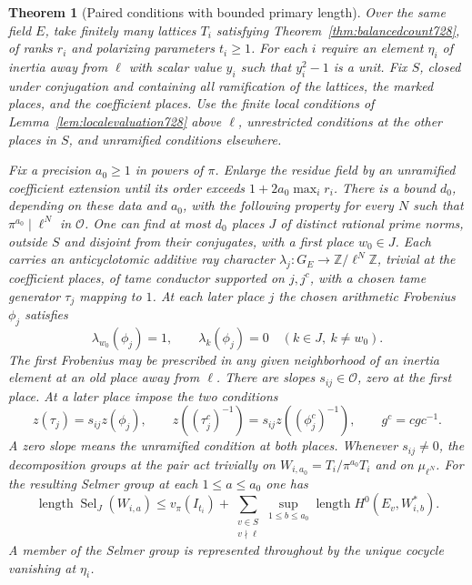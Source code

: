 \documentclass[a4paper,11pt]{article}
\newtheorem{theorem}[proposition]{Theorem}
\theoremstyle{definition}
\theoremstyle{remark}
\newcommand{\ZZ}{\mathbb Z}\newcommand{\ord}{\operatorname{ord}}
\numberwithin{equation}{section}
\begin{document}
\begin{theorem}[Paired conditions with bounded primary length]\leavevmode
\label{thm:tiedlength729}
Over the same field \(E\), take finitely many lattices \(T_i\) satisfying
Theorem~\ref{thm:balancedcount728}, of ranks \(r_i\) and polarizing
parameters \(t_i\ge1\). For each \(i\) require an element \(\eta_i\)
of inertia away from \(\ell\) with scalar value \(y_i\) such that
\(y_i^2-1\) is a unit. Fix \(S\), closed under conjugation and containing
all ramification of the lattices, the marked places, and the coefficient
places. Use the finite local conditions of Lemma~\ref{lem:localevaluation728}
above \(\ell\), unrestricted conditions at the other places in \(S\),
and unramified conditions elsewhere.

Fix a precision \(a_0\ge1\) in powers of \(\pi\). Enlarge the residue
field by an unramified coefficient extension until its order exceeds
\(1+2a_0\max_i r_i\). There is a bound \(d_0\), depending on these data
and \(a_0\), with the following property for every \(N\) such that
\(\pi^{a_0}\mid\ell^N\) in \(\mathcal O\). One can find at most \(d_0\)
places \(J\) of distinct rational prime norms, outside \(S\) and
disjoint from their conjugates, with a first place \(w_0\in J\).
Each carries an anticyclotomic additive ray character
\(\lambda_j:G_E\to\ZZ/\ell^N\ZZ\), trivial at the coefficient places,
of tame conductor supported on \(j,j^c\), with a chosen tame generator
\(\tau_j\) mapping to \(1\). At each later place \(j\) the chosen
arithmetic Frobenius \(\phi_j\) satisfies
\[
          \lambda_{w_0}(\phi_j)=1,\qquad
          \lambda_k(\phi_j)=0\quad(k\in J,\ k\ne w_0).
\]
The first Frobenius may be prescribed in any given neighborhood of
an inertia element at an old place away from \(\ell\).
There are slopes \(s_{ij}\in\mathcal O\), zero at the first place.
At a later place impose the two conditions
\[
 z(\tau_j)=s_{ij}z(\phi_j),\qquad
 z((\tau_j^c)^{-1})=s_{ij}z((\phi_j^c)^{-1}),
 \qquad g^c=cgc^{-1}.
\]
A zero slope means the unramified condition at both places. Whenever
\(s_{ij}\ne0\), the decomposition groups at the pair act trivially on
\(W_{i,a_0}=T_i/\pi^{a_0}T_i\) and on \(\mu_{\ell^N}\).
For the resulting Selmer group at each \(1\le a\le a_0\) one has
\[
 \operatorname{length}\operatorname{Sel}_{J}(W_{i,a})
 \le v_\pi(I_{t_i})
       +\sum_{\substack{v\in S\\v\nmid\ell}}
           \sup_{1\le b\le a_0}\operatorname{length}H^0(E_v,W_{i,b}^*).
\]
A member of the Selmer group is represented throughout by the unique
cocycle vanishing at \(\eta_i\).
\end{theorem}
\end{document}
